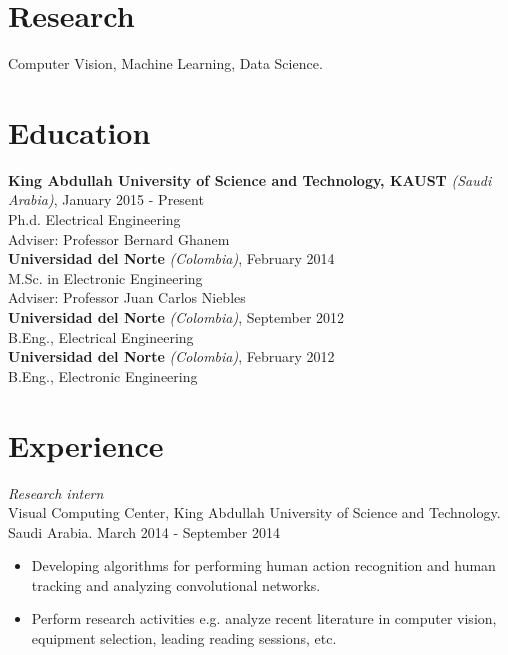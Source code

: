 \documentclass[margin]{res}
\begin{document}
 
 
 
\address{{\bf Present Address} \\ Al Khawarizmi Building (Bldg 1), 2106-WS06
          \\ Thuwal 23955-6900, Kingdom of Saudi Arabia}
\address{{\bf Contact} \\ escorciav@gmail.com - victor.escorcia@kaust.edu.sa}
 
\begin{resume} 
 
\section{Research} 
Computer Vision, Machine Learning, Data Science.


\section{Education}
\textbf{King Abdullah University of Science and Technology, KAUST}
\textit{(Saudi Arabia)}, January 2015 - Present \\
Ph.d. Electrical Engineering\\
\bigskip Adviser: Professor Bernard Ghanem\\
\textbf{Universidad del Norte} \textit{(Colombia)}, February 2014 \\
M.Sc. in Electronic Engineering\\
\bigskip Adviser: Professor Juan Carlos Niebles\\
\textbf{Universidad del Norte} \textit{(Colombia)}, September 2012 \\
B.Eng., Electrical Engineering\\
\textbf{Universidad del Norte} \textit{(Colombia)}, February 2012 \\
B.Eng., Electronic Engineering\\
 

\section{Experience}
 \textit{Research intern}\\
 Visual Computing Center, King Abdullah University of Science and Technology.
 Saudi Arabia. \hfill March 2014 - September 2014 \\
 \begin{itemize} \itemsep -2pt %
 \item Developing algorithms for performing human action recognition and human
       tracking and analyzing convolutional networks.
 \item Perform research activities e.g. analyze recent literature in computer
       vision, equipment selection, leading reading sessions, etc.
 \end{itemize}
 

\end{resume}
\end{document}
